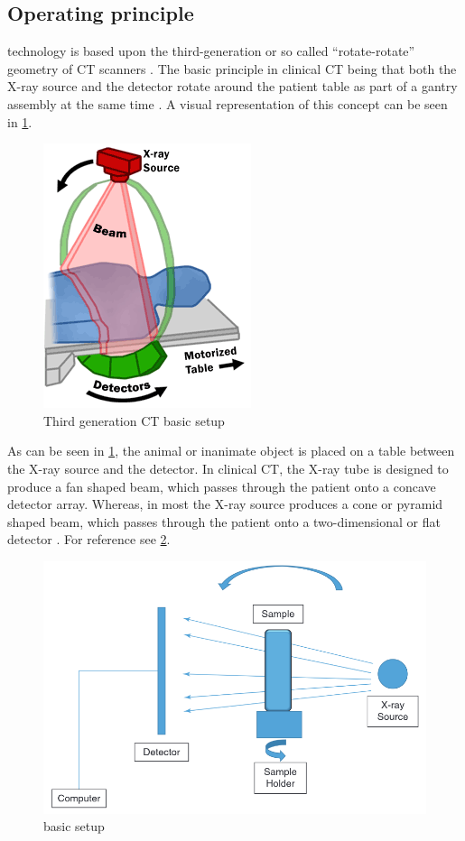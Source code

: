 \subsection{Operating principle}\label{s:b-mct-operation}
\mct\space technology is based upon the third-generation or so called ``rotate-rotate'' geometry of CT scanners \cite{flohrCTSystems2013}.
The basic principle in clinical CT being that both the X-ray source and the detector rotate around the patient table as part of a gantry assembly at the same time \cite{flohrCTSystems2013}.
A visual representation of this concept can be seen in \cref{fig:3ct}.
\begin{figure}[h]
	\centerline{
		\includegraphics[scale=0.5]{images/ct.png}}
	\caption{Third generation CT basic setup \cite{fdaDrawingCTFan2019}}\label{fig:3ct}
\end{figure}

\noindent
As can be seen in \cref{fig:3ct}, the animal or inanimate object is placed on a table between the X-ray source and the detector.
In clinical CT, the X-ray tube is designed to produce a fan shaped beam, which passes through the patient onto a concave detector array.
Whereas, in most \mct\space the X-ray source produces a cone or pyramid shaped beam, which passes through the patient onto a two-dimensional or flat detector \cite{babaComparisonFlatpanelDetector2002,clarkAdvancesMicroCTImaging2021}.
For reference see \cref{fig:mct}.
\begin{figure}[h]
	\centerline{
		\includegraphics[scale=0.5]{images/mct.png}}
	\caption{\mct\space basic setup\cite{orhanMicrocomputedTomographyMicroCT2020}}\label{fig:mct}
\end{figure}

